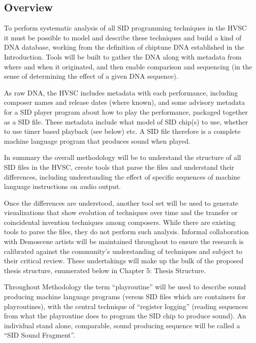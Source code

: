 \documentclass[10pt]{article}
\begin{document}
\begin{multicols*}{2}
    \subsection{Overview}

To perform systematic analysis of all SID programming techniques in the HVSC it must be possible to model and describe these techniques and build a kind of DNA database, working from the definition of chiptune DNA established in the Introduction. Tools will be built to gather the DNA along with metadata from where and when it originated, and then enable comparison and sequencing (in the sense of determining the effect of a given DNA sequence).

As raw DNA, the HVSC includes metadata with each performance, including composer names and release dates (where known), and some advisory metadata for a SID player program about how to play the performance, packaged together as a SID file\cite{sidfile}. These metadata include what model of SID chip(s) to use, whether to use timer based playback (see below) etc. A SID file therefore is a complete machine language program that produces sound when played.

In summary the overall methodology will be to understand the structure of all SID files in the HVSC, create tools that parse the files and understand their differences, including understanding the effect of specific sequences of machine language instructions on audio output. 

Once the differences are understood, another tool set will be used to generate visualizations that show evolution of techniques over time and the transfer or coincidental invention techniques among composers. While there are existing tools\cite{ChiptuneSAK} to parse the files, they do not perform such analysis. Informal collaboration with Demoscene artists will be maintained throughout to ensure the research is calibrated against the community’s understanding of techniques and subject to their critical review. These undertakings will make up the bulk of the proposed thesis structure, enumerated below in Chapter 5: Thesis Structure.

Throughout Methodology the term “playroutine” will be used to describe sound producing machine language programs (versus SID files which are containers for playroutines), with the central technique of “register logging” (reading sequences from what the playroutine does to program the SID chip to produce sound). An individual stand alone, comparable, sound producing sequence will be called a “SID Sound Fragment”.


\end{multicols*}
\end{document}
